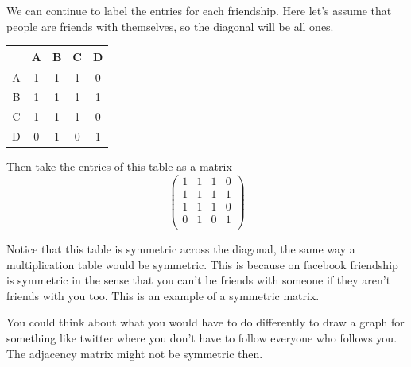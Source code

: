 {We can continue to label the entries for each friendship. Here let's assume that people are friends with themselves, so the diagonal will be all ones.

\begin{center}
\begin{tabular}{r | c c c c}
 & A & B& C & D \\
 \hline
 A &1 &1 &1 &0  \\
 B &1 &1 &1 &1  \\
 C &1 &1 &1 &0  \\
 D &0 &1 &0 &1  \\
\end{tabular}
\end{center}

Then take the entries of this table as a matrix
\[
\left(
\begin{array}{cccc}
1 &1 &1 &0  \\
1 &1 &1 &1  \\
1 &1 &1 &0  \\
0 &1 &0 &1  \\
\end{array} \right)
\]

Notice that this table is symmetric across the diagonal, the same way a multiplication table would be symmetric. This is because on facebook friendship is symmetric in the sense that you can't be friends with someone if they aren't friends with you too. This is an example of a symmetric matrix. 

You could think about what you would have to do differently to draw a graph for something like twitter where you don't have to follow everyone who follows you. The adjacency matrix might not be symmetric then. 


} %


